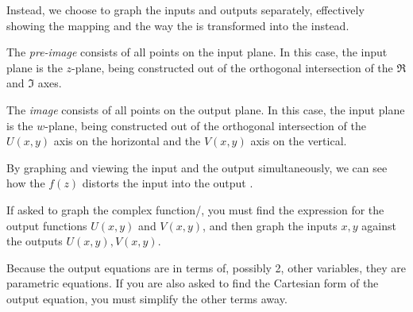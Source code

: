Instead, we choose to graph the inputs and outputs separately, effectively showing the mapping and the way the  is transformed into the  instead.

\begin{definition}\label{def:Pre_Image}
  The \emph{pre-image} consists of all points on the input plane.
  In this case, the input plane is the $z$-plane, being constructed out of the orthogonal intersection of the $\Re$ and $\Im$ axes.
\end{definition}

\begin{definition}[Image]\label{def:Image}
  The \emph{image} consists of all points on the output plane.
  In this case, the input plane is the $w$-plane, being constructed out of the orthogonal intersection of the $U(x, y)$ axis on the horizontal and the $V(x, y)$ axis on the vertical.
\end{definition}

By graphing and viewing the input and the output simultaneously, we can see how the  $f(z)$ distorts the input  into the output .

If asked to graph the complex function/, you must find the expression for the output functions $U(x, y)$ and $V(x, y)$, and then graph the inputs $x, y$ against the outputs $U(x, y), V(x, y)$.

Because the output equations are in terms of, possibly 2, other variables, they are parametric equations.
If you are also asked to find the Cartesian form of the output equation, you must simplify the other terms away.

